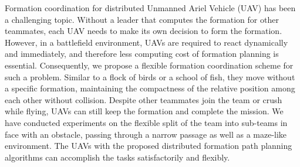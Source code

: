 Formation coordination for distributed Unmanned Ariel Vehicle (UAV) has been a challenging topic. Without a leader that computes the formation for other teammates, each UAV needs to make its own decision to form the formation. However, in a battlefield environment, UAVs are required to react dynamically and immediately, and therefore less computing cost of formation planning is essential. Consequently, we propose a flexible formation coordination scheme for such a problem. Similar to a flock of birds or a school of fish, they move without a specific formation, maintaining the compactness of the relative position among each other without collision. Despite other teammates join the team or crush while flying, UAVs can still keep the formation and complete the mission. We have conducted experiments on the flexible split of the team into sub-teams in face with an obstacle, passing through a narrow passage as well as a maze-like environment. The UAVs with the proposed distributed formation path planning algorithms can accomplish the tasks satisfactorily and flexibly.
\clearpage
